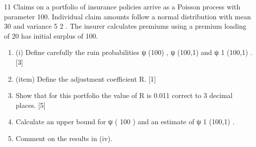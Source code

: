 \documentclass[a4paper,12pt]{article}
\begin{document}
\begin{enumerate}
11
Claims on a portfolio of insurance policies arrive as a Poisson process with parameter
100. Individual claim amounts follow a normal distribution with mean 30 and
variance 5 2 . The insurer calculates premiums using a premium loading of 20%
has initial surplus of 100.
\begin{enumerate}
\item (i) Define carefully the ruin probabilities ψ (100) , ψ (100,1) and ψ 1 (100,1) .
[3]
\item (item) Define the adjustment coefficient R.
[1]
\item  Show that for this portfolio the value of R is 0.011 correct to 3 decimal places.
[5]
\item  Calculate an upper bound for ψ ( 100 ) and an estimate of ψ 1 (100,1) .
\item Comment on the results in (iv).
\end{enumerate}


\end{enumerate}
\end{document}
